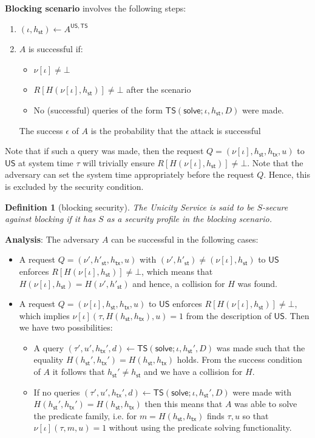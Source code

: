 \documentclass{article}
\newtheorem{definition}{Definition}[section]
\newcommand{\sthash}[0]{h_\mathsf{st}}
\newcommand{\txhash}[0]{h_\mathsf{tx}}
\newcommand{\predi}[0]{\nu}
\newcommand{\systime}[0]{\tau}
\begin{document}
\noindent\textbf{Blocking scenario} involves the following steps:
\begin{enumerate}
\item $(\iota,\sthash)\gets A^{\mathsf{US},\mathsf{TS}}$
\item $A$ is successful if:
\begin{itemize}
\item[a)] $\predi[\iota]\neq\bot$
\item[b)] $R[H(\predi[\iota],\sthash)]\neq\bot$ after the scenario
\item[c)] No (successful) queries of the form $\mathsf{TS}(\mathsf{solve};\iota,\sthash,D)$ were made.
\end{itemize}
The success $\epsilon$ of $A$ is the probability that the attack is successful
\end{enumerate}

\noindent Note that if such a query was made, then the request $Q=(\predi[\iota],\sthash, \txhash,u)$ to $\mathsf{US}$ at system time $\systime$ will trivially ensure $R[H(\predi[\iota],\sthash)]\neq\bot$.
Note that the adversary can set the system time appropriately before the request $Q$. Hence, this is excluded by the security condition. \medskip

\begin{definition}[blocking security]
The Unicity Service is said to be $S$-secure against blocking if it has $S$ as a security profile in the blocking scenario.
\end{definition}

\noindent\textbf{Analysis}: The adversary $A$ can be successful in the following cases:
\begin{itemize}
\item[a)] A request $Q=(\predi', h'_\mathsf{st}, h_\mathsf{tx}, u)$ with $(\predi',h'_\mathsf{st})\neq (\predi[\iota],\sthash)$ to $\mathsf{US}$ enforces $R[H(\predi[\iota], \sthash)]\neq\bot$, which means that  $H(\predi[\iota],\sthash)=H(\predi', h'_\mathsf{st})$ and hence, a collision for $H$ was found.
\item[b)] A request $Q=(\predi[\iota], \sthash, h_\mathsf{tx}, u)$ to $\mathsf{US}$ enforces $R[H(\predi[\iota], \sthash)]\neq\bot$, which implies $\predi[\iota](\systime, H(\sthash,h_\mathsf{tx}), u)=1$ from the description of $\mathsf{US}$. Then we have two possibilities:
\begin{itemize}
\item[b1)] A query $(\systime',u', \txhash', d)\gets\mathsf{TS}(\mathsf{solve};\iota,\sthash',D)$ was made such that the equality
$H(\sthash',\txhash')=H(\sthash,\txhash)$ holds. From the success condition of $A$ it follows that  $\sthash'\neq \sthash$ and we have a collision for $H$.
\item[b2)] If no queries $(\systime',u', \txhash', d)\gets\mathsf{TS}(\mathsf{solve};\iota,\sthash',D)$ were made with $H(\sthash',\txhash')=H(\sthash,\txhash)$ then this means that $A$ was able to
solve the predicate family, i.e. for $m=H(\sthash,\txhash)$ finds $\tau,u$
so that $\predi[\iota](\tau,m,u)=1$ without using the predicate solving functionality.
\end{itemize}
\end{itemize}
\end{document}
